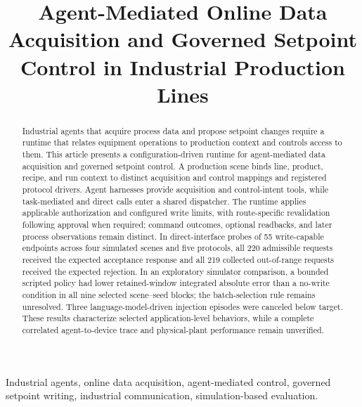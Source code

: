 \documentclass[journal]{IEEEtran}
\begin{document}

\title{Agent-Mediated Online Data Acquisition and Governed Setpoint Control in Industrial Production Lines}

\author{}

\maketitle

\begin{abstract}
Industrial agents that acquire process data and propose setpoint changes require a runtime that relates equipment operations to production context and controls access to them. This article presents a configuration-driven runtime for agent-mediated data acquisition and governed setpoint control. A production scene binds line, product, recipe, and run context to distinct acquisition and control mappings and registered protocol drivers. Agent harnesses provide acquisition and control-intent tools, while task-mediated and direct calls enter a shared dispatcher. The runtime applies applicable authorization and configured write limits, with route-specific revalidation following approval when required; command outcomes, optional readbacks, and later process observations remain distinct. In direct-interface probes of 55 write-capable endpoints across four simulated scenes and five protocols, all 220 admissible requests received the expected acceptance response and all 219 collected out-of-range requests received the expected rejection. In an exploratory simulator comparison, a bounded scripted policy had lower retained-window integrated absolute error than a no-write condition in all nine selected scene--seed blocks; the batch-selection rule remains unresolved. Three language-model-driven injection episodes were canceled below target. These results characterize selected application-level behaviors, while a complete correlated agent-to-device trace and physical-plant performance remain unverified.
\end{abstract}

\begin{IEEEkeywords}
Industrial agents, online data acquisition, agent-mediated control, governed setpoint writing, industrial communication, simulation-based evaluation.
\end{IEEEkeywords}

\IEEEpeerreviewmaketitle
\end{document}
